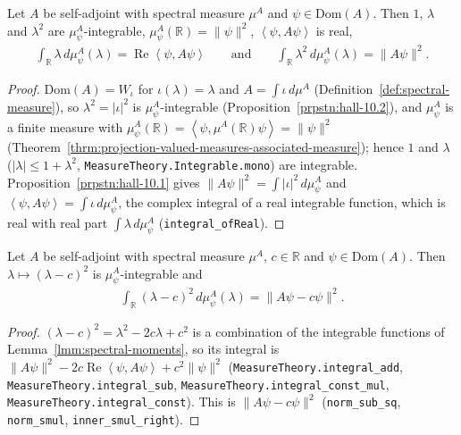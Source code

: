 \begin{lemma}
    \label{lmm:spectral-moments}
    \leanok
    Let $A$ be self-adjoint with spectral measure $\mu^A$ and $\psi \in \text{Dom}(A)$. Then $1$, $\lambda$ and $\lambda^2$ are $\mu^A_\psi$-integrable, $\mu^A_\psi(\mathbb{R}) = \|\psi\|^2$, $\left< \psi, A\psi \right>$ is real,
    \begin{align}
        \int_{\mathbb{R}} \lambda \, d\mu^A_\psi(\lambda) = \operatorname{Re}\left< \psi, A\psi \right> \qquad\text{and}\qquad \int_{\mathbb{R}} \lambda^2 \, d\mu^A_\psi(\lambda) = \|A\psi\|^2.
    \end{align}
\end{lemma}
\begin{proof}
    \leanok
    $\text{Dom}(A) = W_\iota$ for $\iota(\lambda) = \lambda$ and $A = \int \iota \, d\mu^A$ (Definition~\ref{def:spectral-measure}), so $\lambda^2 = |\iota|^2$ is $\mu^A_\psi$-integrable (Proposition~\ref{prpstn:hall-10.2}), and $\mu^A_\psi$ is a finite measure with $\mu^A_\psi(\mathbb{R}) = \left< \psi, \mu^A(\mathbb{R})\psi \right> = \|\psi\|^2$ (Theorem~\ref{thrm:projection-valued-measures-associated-measure}); hence $1$ and $\lambda$ ($|\lambda| \le 1 + \lambda^2$, \texttt{MeasureTheory.Integrable.mono}) are integrable. Proposition~\ref{prpstn:hall-10.1} gives $\|A\psi\|^2 = \int |\iota|^2 \, d\mu^A_\psi$ and $\left< \psi, A\psi \right> = \int \iota \, d\mu^A_\psi$, the complex integral of a real integrable function, which is real with real part $\int \lambda \, d\mu^A_\psi$ (\texttt{integral\_ofReal}).
\end{proof}

\begin{lemma}
    \label{lmm:spectral-eigenvector-variance}
    \leanok
    Let $A$ be self-adjoint with spectral measure $\mu^A$, $c \in \mathbb{R}$ and $\psi \in \text{Dom}(A)$. Then $\lambda \mapsto (\lambda - c)^2$ is $\mu^A_\psi$-integrable and
    \begin{align}
        \int_{\mathbb{R}} (\lambda - c)^2 \, d\mu^A_\psi(\lambda) = \|A\psi - c\psi\|^2.
    \end{align}
\end{lemma}
\begin{proof}
    \leanok
    $(\lambda - c)^2 = \lambda^2 - 2c\lambda + c^2$ is a combination of the integrable functions of Lemma~\ref{lmm:spectral-moments}, so its integral is $\|A\psi\|^2 - 2c\operatorname{Re}\left< \psi, A\psi \right> + c^2\|\psi\|^2$ (\texttt{MeasureTheory.integral\_add}, \texttt{MeasureTheory.integral\_sub}, \texttt{MeasureTheory.integral\_const\_mul}, \texttt{MeasureTheory.integral\_const}). This is $\|A\psi - c\psi\|^2$ (\texttt{norm\_sub\_sq}, \texttt{norm\_smul}, \texttt{inner\_smul\_right}).
\end{proof}

